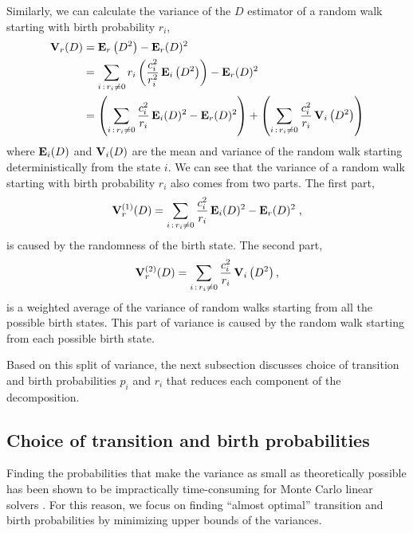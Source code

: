         Similarly, we can calculate the variance of the $D$ estimator of a
        random walk starting with birth probability $r_i$,
        \begin{equation} \label{splitbirth} \begin{split}
            {\bf V}_r(D)
            &= {\bf E}_r\left(D^2\right) - {\bf E}_r(D)^2 \\
            &= \sum_{i\,:\,r_i\ne0} r_i\left(\frac{c_i^2}{r_i^2}\,
               {\bf E}_i\left(D^2\right)\right) - {\bf E}_r(D)^2 \\
            &= \left(\sum_{i\,:\,r_i\ne0} \frac{c_i^2}{r_i}\,
                     {\bf E}_i(D)^2 - {\bf E}_r(D)^2\right)
               + \left( \sum_{i\,:\,r_i\ne0} \frac{c_i^2}{r_i}\,
                       {\bf V}_i\left(D^2\right) \right)
        \end{split} \end{equation}
        where ${\bf E}_i(D)$ and ${\bf V}_i(D)$ are the mean and variance
        of the random walk starting deterministically from the state $i$.
        We can see that the variance of a random walk starting with birth
        probability $r_i$ also comes from two parts. The first part,
        \begin{equation} \label{part1birth}
            {\bf V}_r^{(1)}(D) = 
            \sum_{i\,:\,r_i\ne0} \frac{c_i^2}{r_i}\, {\bf E}_i(D)^2
             - {\bf E}_r(D)^2 \;,
        \end{equation}
        is caused by the randomness of the birth state.  The second part,
        \begin{equation} \label{part2birth}
            {\bf V}_r^{(2)}(D) = 
            \sum_{i\,:\,r_i\ne0} \frac{c_i^2}{r_i}\, {\bf V}_i\left(D^2\right),
        \end{equation}
        is a weighted average of the variance of random walks starting from
        all the possible birth states.  This part of variance is caused by
        the random walk starting from each possible birth state.
        
        Based on this split of variance, the next subsection discusses
        choice of transition and birth probabilities $p_i$ and $r_i$ that
        reduces each component of the decomposition.
    


    \subsection{Choice of transition and birth probabilities}
        Finding the probabilities that make the variance as small as
        theoretically possible has been shown to be impractically
        time-consuming for Monte Carlo linear solvers \cite[]{Dimov1991}
        \cite[]{Dimov1993}.
        For this reason, we focus on finding ``almost optimal'' transition
        and birth probabilities by minimizing upper bounds of the variances.

